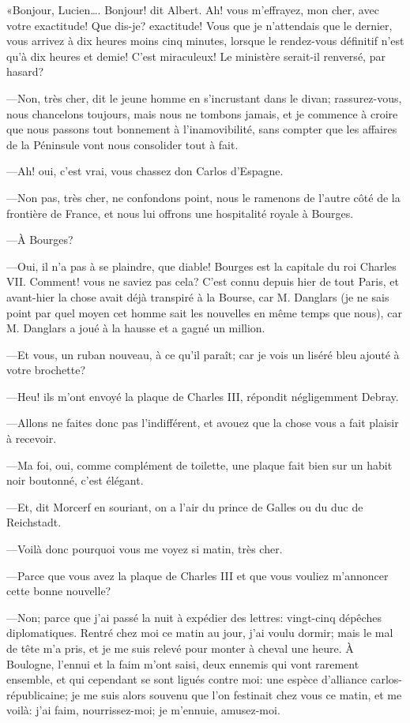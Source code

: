 «Bonjour, Lucien\dots. Bonjour! dit Albert. Ah! vous m'effrayez, mon cher, avec votre exactitude! Que dis-je? exactitude! Vous que je n'attendais que le dernier, vous arrivez à dix heures moins cinq minutes, lorsque le rendez-vous définitif n'est qu'à dix heures et demie! C'est miraculeux! Le ministère serait-il renversé, par hasard? 

—Non, très cher, dit le jeune homme en s'incrustant dans le divan; rassurez-vous, nous chancelons toujours, mais nous ne tombons jamais, et je commence à croire que nous passons tout bonnement à l'inamovibilité, sans compter que les affaires de la Péninsule vont nous consolider tout à fait. 

—Ah! oui, c'est vrai, vous chassez don Carlos d'Espagne. 

—Non pas, très cher, ne confondons point, nous le ramenons de l'autre côté de la frontière de France, et nous lui offrons une hospitalité royale à Bourges. 

—À Bourges? 

—Oui, il n'a pas à se plaindre, que diable! Bourges est la capitale du roi Charles VII. Comment! vous ne saviez pas cela? C'est connu depuis hier de tout Paris, et avant-hier la chose avait déjà transpiré à la Bourse, car M. Danglars (je ne sais point par quel moyen cet homme sait les nouvelles en même temps que nous), car M. Danglars a joué à la hausse et a gagné un million. 

—Et vous, un ruban nouveau, à ce qu'il paraît; car je vois un liséré bleu ajouté à votre brochette? 

—Heu! ils m'ont envoyé la plaque de Charles III, répondit négligemment Debray. 

—Allons ne faites donc pas l'indifférent, et avouez que la chose vous a fait plaisir à recevoir. 

—Ma foi, oui, comme complément de toilette, une plaque fait bien sur un habit noir boutonné, c'est élégant. 

—Et, dit Morcerf en souriant, on a l'air du prince de Galles ou du duc de Reichstadt. 

—Voilà donc pourquoi vous me voyez si matin, très cher. 

—Parce que vous avez la plaque de Charles III et que vous vouliez m'annoncer cette bonne nouvelle? 

—Non; parce que j'ai passé la nuit à expédier des lettres: vingt-cinq dépêches diplomatiques. Rentré chez moi ce matin au jour, j'ai voulu dormir; mais le mal de tête m'a pris, et je me suis relevé pour monter à cheval une heure. À Boulogne, l'ennui et la faim m'ont saisi, deux ennemis qui vont rarement ensemble, et qui cependant se sont ligués contre moi: une espèce d'alliance carlos-républicaine; je me suis alors souvenu que l'on festinait chez vous ce matin, et me voilà: j'ai faim, nourrissez-moi; je m'ennuie, amusez-moi. 

